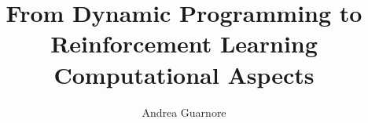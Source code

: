 \documentclass[
	final,
	12pt,
	fleqn
]{masterthesis}
\title{
	From Dynamic Programming to Reinforcement Learning \\
	\large{Computational Aspects}
}
\author{Andrea Guarnore}
\begin{document}
\maketitle

\frontmatter


\mainmatter







\backmatter
\begin{appendices}

\end{appendices}


\end{document}
